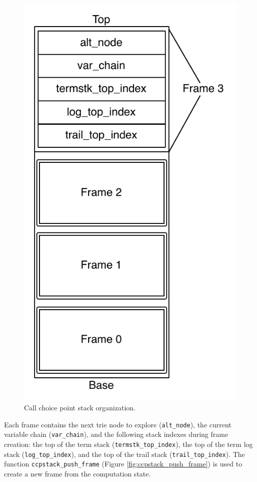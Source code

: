 \begin{figure}[ht]
  \centering
    \includegraphics[scale=0.6]{call_choice_point_stack.pdf}
  \caption{Call choice point stack organization.}
  \label{fig:call_choice_point_stack}
\end{figure}

Each frame contains the next trie node to explore (\texttt{alt\_node}),
the current variable chain (\texttt{var\_chain}),
and the following stack indexes during frame creation:
the top of the term stack (\texttt{termstk\_top\_index}),
the top of the term log stack (\texttt{log\_top\_index}),
and the top of the trail stack (\texttt{trail\_top\_index}).
The function \texttt{ccpstack\_push\_frame} (Figure \ref{fig:ccpstack_push_frame})
is used to create a new frame from the computation state.


